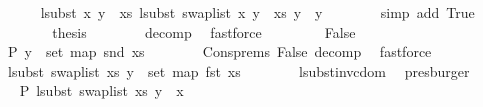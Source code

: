 \begin{isabellebody}
\ \ \ \ \isamarkupfalse%
\ {\isachardoublequoteopen}lsubst\ {\isacharparenleft}{\kern0pt}{\isacharparenleft}{\kern0pt}x{\isacharcomma}{\kern0pt}\ y{\isacharprime}{\kern0pt}{\isacharparenright}{\kern0pt}\ {\isacharhash}{\kern0pt}\ xs{\isacharparenright}{\kern0pt}\ {\isacharparenleft}{\kern0pt}lsubst\ {\isacharparenleft}{\kern0pt}swap{\isacharunderscore}{\kern0pt}list\ {\isacharparenleft}{\kern0pt}{\isacharparenleft}{\kern0pt}x{\isacharcomma}{\kern0pt}\ y{\isacharprime}{\kern0pt}{\isacharparenright}{\kern0pt}\ {\isacharhash}{\kern0pt}\ xs{\isacharparenright}{\kern0pt}{\isacharparenright}{\kern0pt}\ y{\isacharparenright}{\kern0pt}\ {\isacharequal}{\kern0pt}\ y{\isachardoublequoteclose}\isanewline
\ \ \ \ \ \ \isamarkupfalse%
\ {\isacharparenleft}{\kern0pt}simp\ add{\isacharcolon}{\kern0pt}\ True{\isacharparenright}{\kern0pt}\isanewline
\ \ \ \ \isamarkupfalse%
\ \isamarkupfalse%
\ {\isacharquery}{\kern0pt}thesis\isanewline
\ \ \ \ \ \ \isamarkupfalse%
\ decomp\ \isamarkupfalse%
\ fastforce\isanewline
\ \ \isamarkupfalse%
\isanewline
\ \ \ \ \isamarkupfalse%
\ False\isanewline
\ \ \ \ \isamarkupfalse%
\ P{}{\isacharcolon}{\kern0pt}\ {\isachardoublequoteopen}y\ {\isasymin}\ set\ {\isacharparenleft}{\kern0pt}map\ snd\ xs{\isacharparenright}{\kern0pt}{\isachardoublequoteclose}\isanewline
\ \ \ \ \ \ \isamarkupfalse%
\ Cons{\isachardot}{\kern0pt}prems{\isacharparenleft}{\kern0pt}{}{\isacharparenright}{\kern0pt}\ False\ decomp\ \isamarkupfalse%
\ fastforce\isanewline
\ \ \ \ \isamarkupfalse%
\ \isamarkupfalse%
\ {\isachardoublequoteopen}lsubst\ {\isacharparenleft}{\kern0pt}swap{\isacharunderscore}{\kern0pt}list\ xs{\isacharparenright}{\kern0pt}\ y\ {\isasymin}\ set\ {\isacharparenleft}{\kern0pt}map\ fst\ xs{\isacharparenright}{\kern0pt}{\isachardoublequoteclose}\isanewline
\ \ \ \ \ \ \isamarkupfalse%
\ lsubst{\isacharunderscore}{\kern0pt}inv{\isacharunderscore}{\kern0pt}cdom\ \isamarkupfalse%
\ presburger\isanewline
\ \ \ \ \isamarkupfalse%
\ \isamarkupfalse%
\ P{}{\isacharcolon}{\kern0pt}\ {\isachardoublequoteopen}lsubst\ {\isacharparenleft}{\kern0pt}swap{\isacharunderscore}{\kern0pt}list\ xs{\isacharparenright}{\kern0pt}\ y\ {\isasymnoteq}\ x{\isachardoublequoteclose}\isanewline
\ \ \ \ \ \ \isamarkupfalse%

\end{isabellebody}
